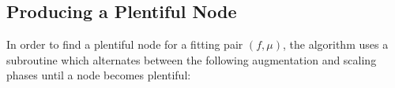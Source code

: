 \documentclass[11pt]{article}
\makeatletter
\let\comment\todo
\newcommand{\frank}[1]{\comment[nolist,color=blue!40]{@frank\\ #1}}
\theoremstyle{definition}
\theoremstyle{definition}
\theoremstyle{definition}
\renewcommand{\todo}[1]{\hl{TODO: #1}}
\makeatother
\begin{document}
    \subsection{Producing a Plentiful Node}
    \label{sec:sub-ppn}
		In order to find a plentiful node for a fitting pair $(f,\mu)$, the algorithm uses a subroutine
		which alternates between the following augmentation and scaling phases until
		a node becomes plentiful:
\end{document}
